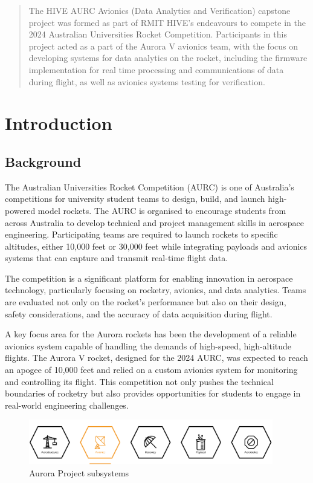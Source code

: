 \pagestyle{fancy}

\begin{abstract}
The HIVE AURC Avionics (Data Analytics and Verification) capstone project was formed as part of RMIT HIVE's endeavours to compete in the 2024 Australian Universities Rocket Competition. Participants in this project acted as a part of the Aurora V avionics team, with the focus on developing systems for data analytics on the rocket, including the firmware implementation for real time processing and communications of data during flight, as well as avionics systems testing for verification.
\end{abstract}

\section{Introduction}


\subsection{Background}
The Australian Universities Rocket Competition (AURC) is one of Australia’s competitions for university student teams to design, build, and launch high-powered model rockets. The AURC is organised to encourage students from across Australia to develop technical and project management skills in aerospace engineering. Participating teams are required to launch rockets to specific altitudes, either 10,000 feet or 30,000 feet while integrating payloads and avionics systems that can capture and transmit real-time flight data. 

The competition is a significant platform for enabling innovation in aerospace technology, particularly focusing on rocketry, avionics, and data analytics. Teams are evaluated not only on the rocket’s performance but also on their design, safety considerations, and the accuracy of data acquisition during flight. 

A key focus area for the Aurora rockets has been the development of a reliable avionics system capable of handling the demands of high-speed, high-altitude flights. The Aurora V rocket, designed for the 2024 AURC, was expected to reach an apogee of 10,000 feet and relied on a custom avionics system for monitoring and controlling its flight. This competition not only pushes the technical boundaries of rocketry but also provides opportunities for students to engage in real-world engineering challenges. 

\begin{figure}[h]
    \begin{center}
        \includegraphics[width=0.95\textwidth]{./img/subsystems_avionics.png}
    \end{center}
    \caption{Aurora Project subsystems}\label{fig:subsystems_avionics}
\end{figure}

